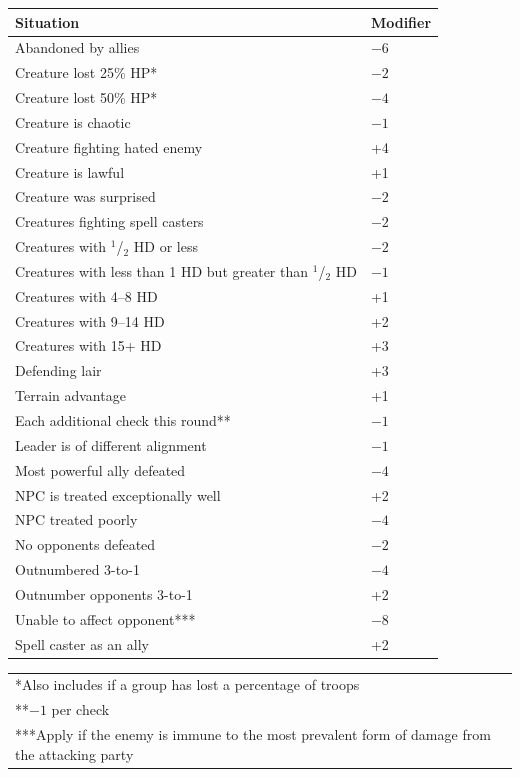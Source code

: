 \begin{multicols}{2}
\begin{minipage}{\columnwidth}
\label{moralemods}
\noindent
\begin{tabular}{|p{}|p{}|}
\hline
Situation	& Modifier \\
\hline\hline
\rowcolor[gray]{.9}Abandoned by allies	& $-6$ \\
Creature lost 25\% HP*	& $-2$ \\
\rowcolor[gray]{.9}Creature lost 50\% HP*	& $-4$ \\
Creature is chaotic	& $-1$ \\
\rowcolor[gray]{.9}Creature fighting hated enemy	& +4 \\
Creature is lawful	& +1 \\
\rowcolor[gray]{.9}Creature was surprised	& $-2$ \\
Creatures fighting spell casters	& $-2$ \\
\rowcolor[gray]{.9}Creatures with $^1$/$_2$ HD or less	& $-2$ \\
Creatures with less than 1 HD but greater than $^1$/$_2$ HD & $-1$ \\
\rowcolor[gray]{.9}Creatures with 4--8 HD	& +1 \\
Creatures with 9--14 HD	& +2 \\
\rowcolor[gray]{.9}Creatures with 15+ HD	& +3 \\
Defending lair	& +3 \\
\rowcolor[gray]{.9}Terrain advantage	& +1 \\
Each additional check this round**	& $-1$ \\
\rowcolor[gray]{.9}Leader is of different alignment	& $-1$ \\
Most powerful ally defeated	& $-4$ \\
\rowcolor[gray]{.9}NPC is treated exceptionally well	& +2 \\
NPC treated poorly	& $-4$ \\
\rowcolor[gray]{.9}No opponents defeated	& $-2$ \\
Outnumbered 3-to-1	& $-4$ \\
\rowcolor[gray]{.9}Outnumber opponents 3-to-1	& +2 \\
Unable to affect opponent***	& $-8$ \\
\rowcolor[gray]{.9}Spell caster as an ally	& +2 \\
\hline
\end{tabular}
\noindent\begin{tabular}{p{}}
*Also includes if a group has lost a percentage of troops \\
**$-1$ per check \\
***Apply if the enemy is immune to the most prevalent form of damage from the attacking party \\
\end{tabular}\vspace{.5em}


\end{minipage}
\end{multicols}
